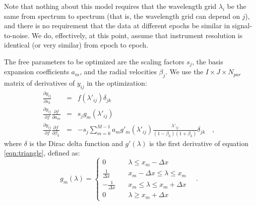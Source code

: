\documentclass[12pt, letterpaper]{article}
\begin{document}
Note that nothing about this model requires that the wavelength grid
$\lambda_i$ be the same from spectrum to spectrum (that is, the
wavelength grid can depend on $j$), and there is no requirement that
the data at different epochs be similar in signal-to-noise. We do,
effectively, at this point, assume that instrument resolution is
identical (or very similar) from epoch to epoch.

The free parameters to be optimized are the scaling factors $s_j$, the basis expansion
coefficients $a_m$, and the radial velocities $\beta_j$. We use the $I\times J\times N_{par}$ matrix 
of derivatives of $y_{ij}$ in the optimization:
\begin{eqnarray}
  \frac{\partial y_{ij}}{\partial s_k} &=& f(\lambda'_{ij}) \delta_{jk}
  \\
  \frac{\partial y_{ij}}{\partial f} \frac{\partial f}{\partial a_m} &=& s_j g_m(\lambda'_{ij})
  \\
  \frac{\partial y_{ij}}{\partial f} \frac{\partial f}{\partial \beta_k} &=& 
  - s_j \sum_{m=0}^{M-1} a_m g'_m(\lambda'_{ij}) \frac{\lambda'_{ij}}{(1 - \beta_k)(1 + \beta_k)}
  \delta_{jk}
  \quad ,
\end{eqnarray}
where $\delta$ is the Dirac delta function and $g'(\lambda)$ is the first derivative of equation \ref{eqn:triangle},
defined as:
\begin{equation}
  g_m(\lambda) = \left\{
        \begin{array}{ll}
            0 & \quad \lambda \leq x_m -\Delta x \\
            \frac{1}{\Delta x} & \quad x_m - \Delta x \leq \lambda \leq x_m \\
            - \frac{1}{\Delta x} & \quad x_m \leq \lambda \leq x_m + \Delta x \\
            0 & \quad \lambda \geq x_m + \Delta x
        \end{array}
    \right.
    \quad .
\end{equation}
\end{document}
